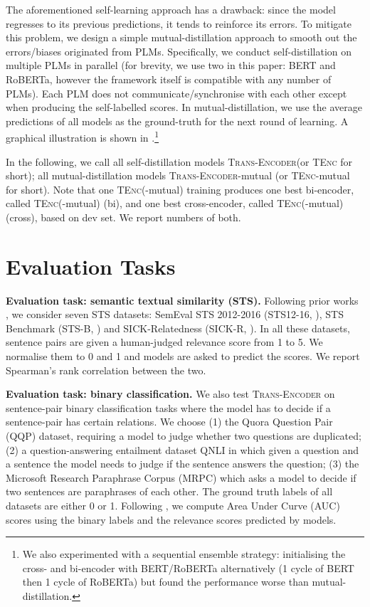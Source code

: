 \documentclass{article} \usepackage{iclr2021_conference,times}
\newcommand{\modelname}{\textsc{Trans-Encoder}\xspace}
\newcommand{\tenc}{\textsc{TEnc}\xspace}
\begin{document}
The aforementioned self-learning approach has a drawback: since the model regresses to its previous predictions, it tends to reinforce its errors. To mitigate this problem, we design a simple mutual-distillation approach to smooth out the errors/biases originated from PLMs. 
Specifically, we conduct self-distillation on multiple PLMs in parallel (for brevity, we use two in this paper: BERT and RoBERTa, however the framework itself is compatible with any number of PLMs). 
Each PLM does not communicate/synchronise with each other except when producing the self-labelled scores. In mutual-distillation, we use the average predictions of all models as the ground-truth for the next round of learning. A graphical illustration is shown in .\footnote{We also experimented with a sequential ensemble strategy: initialising the cross- and bi-encoder with BERT/RoBERTa alternatively (1 cycle of BERT then 1 cycle of RoBERTa) but found the performance worse than mutual-distillation.}

In the following, we call all self-distillation models \modelname (or \tenc for short); all mutual-distillation models \modelname-mutual (or \tenc-mutual for short). Note that one \tenc(-mutual) training produces one best bi-encoder, called \tenc(-mutual) (bi), and one best cross-encoder, called \tenc(-mutual) (cross), based on dev set. We report numbers of both.


\section{Evaluation Tasks}

\textbf{Evaluation task: semantic textual similarity (STS).} 
Following prior works \citep{reimers2019sentence,liu2021fast,gao2021simcse}, we consider seven STS datasets: SemEval STS 2012-2016 (STS12-16, \citealt{agirre2012semeval,agirre2013sem,agirre2014semeval,agirre2015semeval,agirre2016semeval}), STS Benchmark (STS-B, \citealt{cer2017semeval}) and SICK-Relatedness (SICK-R, \citealt{marelli2014sick}). 
In all these datasets, sentence pairs are given a human-judged relevance score from 1 to 5. 
We normalise them to 0 and 1 and models are asked to predict the scores. 
We report Spearman's  rank correlation between the two.

\textbf{Evaluation task: binary classification.} 
We also test \modelname on sentence-pair binary classification tasks where the model has to decide if a sentence-pair has certain relations. 
We choose (1) the Quora Question Pair (QQP) dataset, requiring a model to judge whether two questions are duplicated; (2) a question-answering entailment dataset QNLI \citep{rajpurkar2016squad,wang2018glue} in which given a question and a sentence the model needs to judge if the sentence answers the question; (3) the Microsoft Research Paraphrase Corpus (MRPC) which asks a model to decide if two sentences are paraphrases of each other. The ground truth labels of all datasets are either 0 or 1. Following \citep{li-etal-2020-sentence,liu2021fast}, we compute Area Under Curve (AUC) scores using the binary labels and the relevance scores predicted by models.
\end{document}
